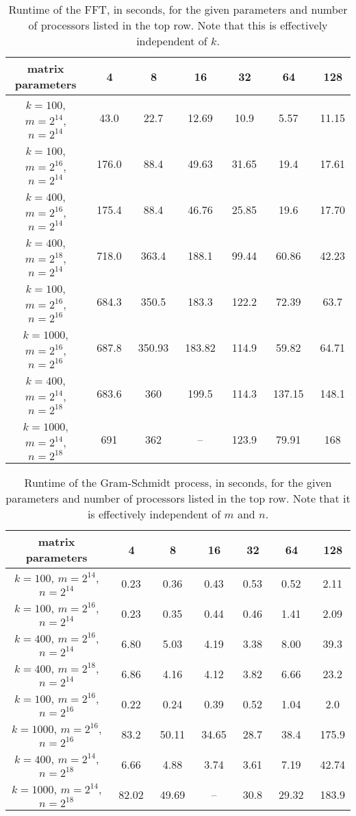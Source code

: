 \documentclass[11pt]{article}
\begin{document}
\begin{table}[here]
\centering
\begin{tabular}{|c|c|c|c|c|c|c|}\hline
matrix parameters &\ 4 &\ 8 &\ 16 &\ 32 &\ 64 &\ 128  \\ \hline
$k=100$, $m=2^{14}$, $n=2^{14}$ &\ 43.0 &\ 22.7 &\ 12.69  &\  10.9 &\  5.57  &\   11.15 \\ 
$k=100$, $m=2^{16}$, $n=2^{14}$ &\  176.0 &\ 88.4 &\  49.63 &\  31.65 &\    19.4 &\  17.61 \\ 
$k=400$, $m=2^{16}$, $n=2^{14}$ &\  175.4  &\  88.4 &\  46.76  &\  25.85 &\   19.6 &\  17.70 \\ 
$k=400$, $m=2^{18}$, $n=2^{14}$ &\  718.0  &\ 363.4  &\  188.1  &\ 99.44   &\  60.86   &\ 42.23  \\ 
$k=100$, $m=2^{16}$, $n=2^{16}$ &\  684.3 &\  350.5 &\  183.3 &\  122.2 &\  72.39  &\  63.7  \\ 
$k=1000$, $m=2^{16}$, $n=2^{16}$ &\   687.8  &\  350.93 &\  183.82 &\ 114.9  &\  59.82   &\  64.71  \\ 
$k=400$, $m=2^{14}$, $n=2^{18}$ &\  683.6 &\ 360 &\  199.5  &\  114.3  &\  137.15  &\  148.1  \\ 
$k=1000$, $m=2^{14}$, $n=2^{18}$ &\  691  &\  362 &\  -- &\   123.9 &\   79.91 &\ 168  \\  \hline
\end{tabular}
\caption{Runtime of the FFT, in seconds, for the given parameters and number of processors listed in the top row.  Note that this is effectively independent of $k$.}
\label{bigt1}
\end{table}
\begin{table}[here]
\centering
\begin{tabular}{|c|c|c|c|c|c|c|}\hline
matrix parameters &\ 4 &\ 8 &\ 16 &\ 32 &\ 64 &\ 128  \\ \hline
$k=100$, $m=2^{14}$, $n=2^{14}$ &\ 0.23 &\ 0.36 &\  0.43 &\  0.53  &\  0.52   &\  2.11 \\ 
$k=100$, $m=2^{16}$, $n=2^{14}$ &\  0.23  &\  0.35 &\  0.44  &\  0.46 &\  1.41   &\  2.09  \\ 
$k=400$, $m=2^{16}$, $n=2^{14}$ &\  6.80 &\ 5.03 &\ 4.19  &\  3.38 &\   8.00 &\  39.3  \\ 
$k=400$, $m=2^{18}$, $n=2^{14}$ &\  6.86 &\  4.16 &\  4.12 &\   3.82 &\  6.66  &\ 23.2  \\ 
$k=100$, $m=2^{16}$, $n=2^{16}$ &\  0.22 &\ 0.24  &\ 0.39   &\  0.52 &\  1.04   &\ 2.0  \\ 
$k=1000$, $m=2^{16}$, $n=2^{16}$ &\  83.2 &\ 50.11  &\  34.65 &\  28.7 &\ 38.4   &\  175.9 \\ 
$k=400$, $m=2^{14}$, $n=2^{18}$ &\  6.66 &\  4.88 &\ 3.74  &\  3.61  &\    7.19 &\  42.74  \\ 
$k=1000$, $m=2^{14}$, $n=2^{18}$ &\ 82.02  &\  49.69 &\  --  &\  30.8 &\   29.32 &\  183.9 \\  \hline
\end{tabular}
\caption{Runtime of the Gram-Schmidt process, in seconds, for the given parameters and number of processors listed in the top row.   Note that it is effectively independent of $m$ and $n$.}
\label{bigt2}
\end{table}
\end{document}
